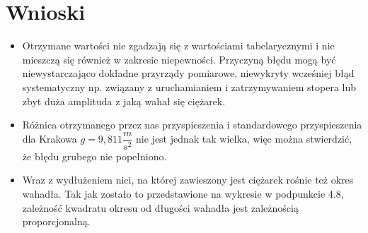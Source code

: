 \documentclass[a4paper,11pt]{article}
\begin{document}
\section{Wnioski}
\begin{itemize}
\item Otrzymane wartości nie zgadzają się z wartościami tabelarycznymi i nie mieszczą się również w zakresie niepewności. Przyczyną błędu mogą być niewystarczająco dokładne przyrządy pomiarowe, niewykryty wcześniej błąd systematyczny np. związany z uruchamianiem i zatrzymywaniem stopera lub zbyt duża amplituda z jaką wahał się ciężarek.  
\item Różnica otrzymanego przez nas przyspieszenia i standardowego przyspieszenia dla Krakowa $g=9,811\dfrac{m}{s^{2}}$ nie jest jednak tak wielka, więc można stwierdzić, że błędu grubego nie popełniono.
\item Wraz z wydłużeniem nici, na której zawieszony jest ciężarek rośnie też okres wahadła. Tak jak zostało to przedstawione na wykresie w podpunkcie 4.8, zależność kwadratu okresu od długości wahadła jest zależnością proporcjonalną.
\end{itemize}
\end{document}
